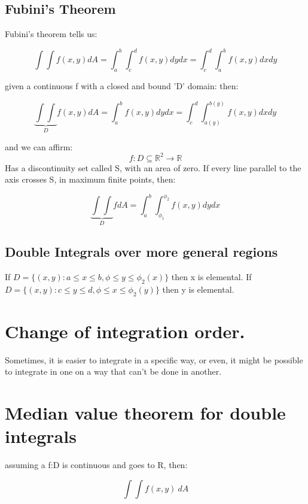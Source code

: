 \documentclass[11pt,fleqn]{book} %
\begin{document}
\subsection{Fubini's Theorem}

Fubini's theorem tells us:

$$\int\int f(x,y) dA = \int_a^b \int_c^d f(x,y) dydx = \int_c^d \int_a^b f(x,y) dxdy$$


given a continuous f with a closed and bound 'D' domain: then:

\begin{equation}
    \underbrace{\int \int}_{D} f(x,y) dA = \int_a^b f(x,y) dy dx = \int_c^d \int_{a(y)}^{b(g)} f(x,y) dxdy
\end{equation}

and we can affirm:
\begin{equation}
    f: D \subseteq \mathbb{R}^2 \to \mathbb{R}
\end{equation} Has a discontinuity set called S, with an area of zero. If every line parallel to the axis crosses S, in maximum
finite points, then:

\begin{equation}
    \underbrace{\int \int}_{D} fdA = \int_a^b \int_{\phi_1}^{\phi_2} f(x,y) dydx
\end{equation}

\subsection{Double Integrals over more general regions}

If $D = \{ (x,y) : a \leq x \leq b, \phi \leq y \leq \phi_2(x)  \}$
then x is elemental. If $D = \{ (x,y) : c \leq y \leq d, \phi \leq x \leq \phi_2(y)  \}$
then y is elemental.

\section{Change of integration order.}
Sometimes, it is easier to integrate in a specific way, or even, it might be possible to integrate in one on a way that can't be done in another.

\section{Median value theorem for double integrals}

assuming a f:D is continuous and goes to R, then: 

$$\int \int f(x,y) \ dA $$
\end{document}
